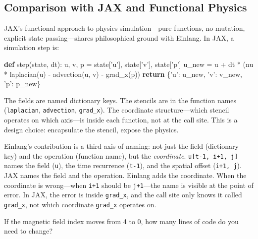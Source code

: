 \documentclass[11pt,titlepage]{article}
\newenvironment{Shaded}{}{}
\newcommand{\ControlFlowTok}[1]{\textcolor[rgb]{0.00,0.44,0.13}{\textbf{#1}}}
\newcommand{\KeywordTok}[1]{\textcolor[rgb]{0.00,0.44,0.13}{\textbf{#1}}}
\newcommand{\NormalTok}[1]{#1}
\newcommand{\OperatorTok}[1]{\textcolor[rgb]{0.40,0.40,0.40}{#1}}
\newcommand{\StringTok}[1]{\textcolor[rgb]{0.25,0.44,0.63}{#1}}
\begin{document}
\vspace{2em}

\hypertarget{comparison-with-jax-and-functional-physics}{%
\subsection{Comparison with JAX and Functional
Physics}\label{comparison-with-jax-and-functional-physics}}

JAX's functional approach to physics simulation---pure functions, no
mutation, explicit state passing---shares philosophical ground with
Einlang. In JAX, a simulation step is:

\begin{Shaded}
\begin{Highlighting}[]
\KeywordTok{def}\NormalTok{ step(state, dt):}
\NormalTok{    u, v, p }\OperatorTok{=}\NormalTok{ state[}\StringTok{'u'}\NormalTok{], state[}\StringTok{'v'}\NormalTok{], state[}\StringTok{'p'}\NormalTok{]}
\NormalTok{    u_new }\OperatorTok{=}\NormalTok{ u }\OperatorTok{+}\NormalTok{ dt }\OperatorTok{*}\NormalTok{ (nu }\OperatorTok{*}\NormalTok{ laplacian(u) }\OperatorTok{-}\NormalTok{ advection(u, v) }\OperatorTok{-}\NormalTok{ grad_x(p))}
    \ControlFlowTok{return}\NormalTok{ \{}\StringTok{'u'}\NormalTok{: u_new, }\StringTok{'v'}\NormalTok{: v_new, }\StringTok{'p'}\NormalTok{: p_new\}}
\end{Highlighting}
\end{Shaded}

The fields are named dictionary keys. The stencils are in the function
names (\texttt{laplacian}, \texttt{advection}, \texttt{grad\_x}). The
coordinate structure---which stencil operates on which axis---is inside
each function, not at the call site. This is a design choice:
encapsulate the stencil, expose the physics.

Einlang's contribution is a third axis of naming: not just the field
(dictionary key) and the operation (function name), but the
\emph{coordinate}. \texttt{u{[}t-1,\ i+1,\ j{]}} names the field
(\texttt{u}), the time recurrence (\texttt{t-1}), and the spatial offset
(\texttt{i+1,\ j}). JAX names the field and the operation. Einlang adds
the coordinate. When the coordinate is wrong---when \texttt{i+1} should
be \texttt{j+1}---the name is visible at the point of error. In JAX, the
error is inside \texttt{grad\_x}, and the call site only knows it called
\texttt{grad\_x}, not which coordinate \texttt{grad\_x} operates on.

If the magnetic field index moves from 4 to 0, how many lines of code do
you need to change?
\end{document}
